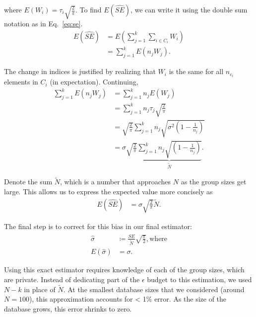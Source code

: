 \noindent where $E(W_i) = \tau_i \sqrt{\frac{2}{\pi}}$.  To find $E(\widehat{SE})$, we can write it using the double sum notation as in Eq.~\eqref{eq:se}.
\begin{align*}
E(\widehat{SE}) &= E\left(\sum_{j=1}^k \sum_{i \in C_i} W_i \right) \\
&= \sum_{j=1}^k E\left(n_j W_j \right).
\end{align*}

\noindent The change in indices is justified by realizing that $W_i$ is the same for all $n_{c_i}$ elements in $C_i$ (in expectation). Continuing,
\begin{align*}
\sum_{j=1}^k E\left(n_j W_j \right) &= \sum_{j=1}^k n_j E\left(W_j \right) \\
&= \sum_{j=1}^k n_j \tau_j \sqrt{\frac{2}{\pi}} \\
&= \sqrt{\frac{2}{\pi}} \sum_{j=1}^k n_j \sqrt{\sigma^2\left(1 - \frac{1}{n_j}\right)}  \\
&= \sigma \sqrt{\frac{2}{\pi}} \underbrace{\sum_{j=1}^k n_j \sqrt{\left(1 - \frac{1}{n_j}\right)}}_{\tilde{N}}.
\end{align*}

\noindent Denote the sum $\tilde{N}$, which is a number that approaches $N$ as the group sizes get large. This allows us to express the expected value more concisely as
\begin{align*}
E(\widehat{SE}) &= \sigma \sqrt{\frac{2}{\pi}} \tilde{N}.
\end{align*}

The final step is to correct for this bias in our final estimator:
\begin{align*}
\hat{\sigma} &\coloneqq \frac{\widehat{SE}}{\tilde{N}}\sqrt{\frac{\pi}{2}}, \text{where}\\
E\left(\hat{\sigma}\right) &= \sigma.
\end{align*}

\noindent Using this exact estimator requires knowledge of each of the group sizes, which are private. Instead of dedicating part of the $\epsilon$ budget to this estimation, we used $N - k$ in place of $\tilde{N}$. At the smallest database sizes that we considered (around $N = 100$), this approximation accounts for < 1\% error. As the size of the database grows, this error shrinks to zero.

